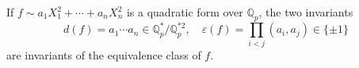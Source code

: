 If $f \sim a_1 X_1^2 + \cdots + a_n X_n^2$ is a quadratic form over $\mathbb{Q}_p$, the two invariants
$$d(f) = a_1 \cdots a_n \in \mathbb{Q}_p^*/\mathbb{Q}_p^{*2}, \quad \varepsilon(f) = \prod_{i < j} (a_i, a_j) \in \{\pm 1\}$$
are invariants of the equivalence class of $f$.
